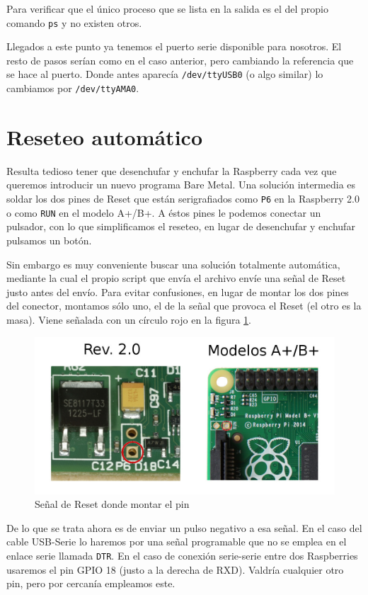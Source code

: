 Para verificar que el único proceso que se lista en la salida es el del propio comando {\tt ps}
y no existen otros.

Llegados a este punto ya tenemos el puerto serie disponible para nosotros. El resto de pasos
serían como en el caso anterior, pero cambiando la referencia que se hace al puerto. Donde
antes aparecía {\tt /dev/ttyUSB0} (o algo similar) lo cambiamos por {\tt /dev/ttyAMA0}.

\section{Reseteo automático}

Resulta tedioso tener que desenchufar y enchufar la Raspberry cada vez que queremos introducir
un nuevo programa Bare Metal. Una solución intermedia es soldar los dos pines de Reset que
están serigrafiados como {\tt P6} en la Raspberry 2.0 o como {\tt RUN} en el modelo A+/B+.
A éstos pines le podemos conectar un pulsador, con lo que simplificamos el reseteo, en lugar de
desenchufar y enchufar pulsamos un botón.

Sin embargo es muy conveniente buscar una solución totalmente automática, mediante la cual
el propio script que envía el archivo envíe una señal de Reset justo antes del envío. Para
evitar confusiones, en lugar de montar los dos pines del conector, montamos sólo uno, el
de la señal que provoca el Reset (el otro es la masa). Viene señalada con un círculo rojo
en la figura \ref{fig:pinReset}.

\begin{figure}[h]
  \centering
    \includegraphics[width=14cm]{graphs/pinReset.jpg}
  \caption{Señal de Reset donde montar el pin}
  \label{fig:pinReset}
\end{figure}

De lo que se trata ahora es de enviar un pulso negativo a esa señal. En el caso del cable
USB-Serie lo haremos por una señal programable que no se emplea en el enlace serie llamada
{\tt DTR}. En el caso de conexión serie-serie entre dos Raspberries usaremos el pin GPIO 18
(justo a la derecha de RXD). Valdría cualquier otro pin, pero por cercanía empleamos este.

